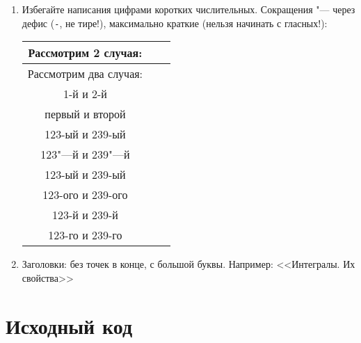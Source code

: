\begin{enumerate}
\item
	Избегайте написания цифрами коротких числительных.
	Сокращения "--- через дефис (\verb!-!, не тире!), максимально краткие (нельзя начинать с гласных!):
	\begin{center}\begin{tabular}{|c|c|c|}
		\hline Рассмотрим 2 случая: \bad \\
		\hline Рассмотрим два случая: \ok \\
		\hline 1-й и 2-й \bad \\
		\hline первый и второй \ok\\
		\hline 123-ый и 239-ый \bad \\
		\hline 123"---й и 239"---й \bad \\
		\hline 123-ый и 239-ый \bad \\
		\hline 123-ого и 239-ого \bad \\
		\hline 123-й и 239-й \ok \\
		\hline 123-го и 239-го \ok \\
		\hline
	\end{tabular}\end{center}

\item
	Заголовки: без точек в конце, с большой буквы. Например: <<Интегралы. Их свойства>>
\end{enumerate}

\section{Исходный код}


